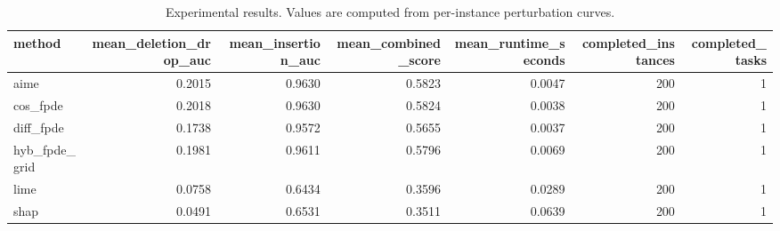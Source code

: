 \begin{table}[t]
\caption{Experimental results. Values are computed from per-instance perturbation curves.}
\label{tab:main_results_computed}
\centering
\begin{tabular}{lrrrrrr}
\toprule
method & mean\_deletion\_drop\_auc & mean\_insertion\_auc & mean\_combined\_score & mean\_runtime\_seconds & completed\_instances & completed\_tasks \\
\midrule
aime & 0.2015 & 0.9630 & 0.5823 & 0.0047 & 200 & 1 \\
cos\_fpde & 0.2018 & 0.9630 & 0.5824 & 0.0038 & 200 & 1 \\
diff\_fpde & 0.1738 & 0.9572 & 0.5655 & 0.0037 & 200 & 1 \\
hyb\_fpde\_grid & 0.1981 & 0.9611 & 0.5796 & 0.0069 & 200 & 1 \\
lime & 0.0758 & 0.6434 & 0.3596 & 0.0289 & 200 & 1 \\
shap & 0.0491 & 0.6531 & 0.3511 & 0.0639 & 200 & 1 \\
\bottomrule
\end{tabular}

\end{table}
